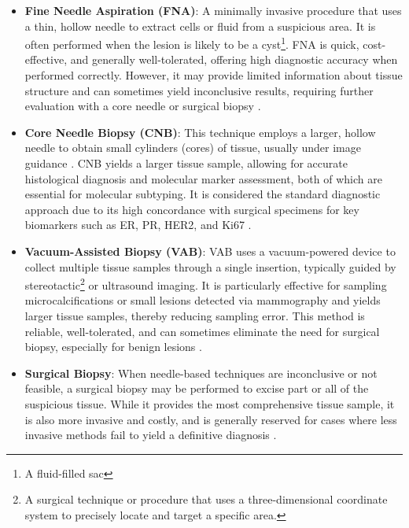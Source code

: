 \documentclass[a4paper,10pt]{book}
\begin{document}
\begin{itemize}
    \item \textbf{Fine Needle Aspiration (FNA)}: A minimally invasive procedure that uses a thin, hollow needle to extract cells or fluid from a suspicious area. It is often performed when the lesion is likely to be a cyst\footnote{A fluid-filled sac}. FNA is quick, cost-effective, and generally well-tolerated, offering high diagnostic accuracy when performed correctly. However, it may provide limited information about tissue structure and can sometimes yield inconclusive results, requiring further evaluation with a core needle or surgical biopsy \cite{noauthor_fine_nodate, silva_breast_2023}.
    
    \item \textbf{Core Needle Biopsy (CNB)}: This technique employs a larger, hollow needle to obtain small cylinders (cores) of tissue, usually under image guidance \cite{CoreNeedleBiopsy, silva_breast_2023}. CNB yields a larger tissue sample, allowing for accurate histological diagnosis and molecular marker assessment, both of which are essential for molecular subtyping. It is considered the standard diagnostic approach due to its high concordance with surgical specimens for key biomarkers such as ER, PR, HER2, and Ki67 \cite{jeong_analysis_2020}.
    
    \item \textbf{Vacuum-Assisted Biopsy (VAB)}: VAB uses a vacuum-powered device to collect multiple tissue samples through a single insertion, typically guided by stereotactic\footnote{A surgical technique or procedure that uses a three-dimensional coordinate system to precisely locate and target a specific area.} or ultrasound imaging. It is particularly effective for sampling microcalcifications or small lesions detected via mammography and yields larger tissue samples, thereby reducing sampling error. This method is reliable, well-tolerated, and can sometimes eliminate the need for surgical biopsy, especially for benign lesions \cite{park_vacuum-assisted_2014}.
    
    \item \textbf{Surgical Biopsy}: When needle-based techniques are inconclusive or not feasible, a surgical biopsy may be performed to excise part or all of the suspicious tissue. While it provides the most comprehensive tissue sample, it is also more invasive and costly, and is generally reserved for cases where less invasive methods fail to yield a definitive diagnosis \cite{silva_breast_2023}.
\end{itemize}
\end{document}
